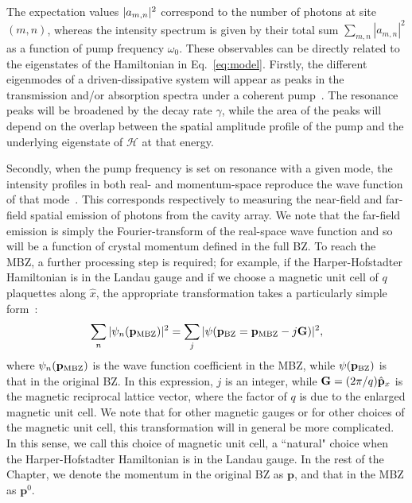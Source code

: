 The expectation values $\vert a_{m,n} \vert^2$ correspond to the number of
photons at site $(m,n)$, whereas the intensity spectrum is given by
their total sum $\sum_{m,n} |a_{m,n}|^2$ as a function of pump
frequency $\omega_0$. These observables can be directly related to the
eigenstates of the Hamiltonian in Eq.~\eqref{eq:model}. Firstly, the
different eigenmodes of a driven-dissipative system will appear as
peaks in the transmission and/or absorption spectra under a coherent
pump~\cite{carusotto2013fluids}. The resonance peaks will be broadened
by the decay rate $\gamma$, while the area of the peaks will depend on
the overlap between the spatial amplitude profile of the pump and the
underlying eigenstate of $\mathcal{H}$ at that energy.

Secondly, when the pump frequency is set on resonance with a given
mode, the intensity profiles in both real- and momentum-space
reproduce the wave function of that
mode~\cite{carusotto2013fluids}. This corresponds respectively to
measuring the near-field and far-field spatial emission of photons
from the cavity array. We note that the far-field emission is simply
the Fourier-transform of the real-space wave function and so will be a
function of crystal momentum defined in the full BZ. To reach the MBZ,
a further processing step is required; for example, if the
Harper-Hofstadter Hamiltonian is in the Landau gauge and if we choose
a magnetic unit cell of $q$ plaquettes along $\hat{x}$, the
appropriate transformation takes a particularly simple
form~\cite{price2014magnetic}:
%
\begin{equation} \label{eq:trans} \sum_n
\vert \psi_n(\mathbf{p}_\mathrm{MBZ}) \vert^2 = \sum_j
\vert \psi(\mathbf{p}_\mathrm{BZ} = \mathbf{p}_\mathrm{MBZ}- j\mathbf{G}) \vert^2 ,
\end{equation}
%
where $\psi_n(\mathbf{p}_\mathrm{MBZ})$ is the wave function coefficient
in the MBZ, while $\psi(\mathbf{p}_\mathrm{BZ})$ is that in the original
BZ. In this expression, $j$ is an integer, while
$\mathbf{G} = (2\pi/q) \hat{\mathbf{p}}_x $ is the magnetic reciprocal lattice
vector, where the factor of $q$ is due to the enlarged magnetic unit
cell. We note that for other magnetic gauges or for other choices of
the magnetic unit cell, this transformation will in general be more
complicated. In this sense, we call this choice of magnetic unit cell,
a ``natural" choice when the Harper-Hofstadter Hamiltonian is in the
Landau gauge.  In the rest of the Chapter, we denote the momentum in
the original BZ as $\mathbf{p}$, and that in the MBZ as
$\mathbf{p}^0$.

